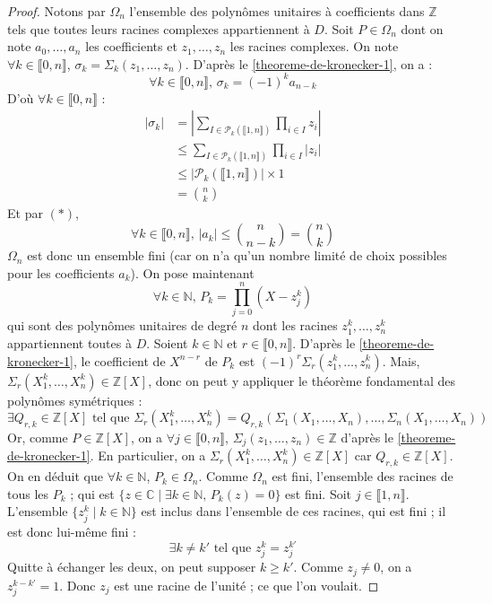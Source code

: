 	\begin{proof}
		Notons par $\Omega_n$ l'ensemble des polynômes unitaires à coefficients dans $\mathbb{Z}$ tels que toutes leurs racines complexes appartiennent à $D$. Soit $P \in \Omega_n$ dont on note $a_0, \dots, a_n$ les coefficients et $z_1, \dots, z_n$ les racines complexes. On note $\forall k \in \llbracket 0, n \rrbracket$, $\sigma_k = \Sigma_k(z_1, \dots, z_n)$. D'après le \cref{theoreme-de-kronecker-1}, on a :
		\[ \forall k \in \llbracket 0, n \rrbracket, \, \sigma_k = (-1)^k a_{n-k} \tag{$*$} \]
		D'où $\forall k \in \llbracket 0, n \rrbracket$ :
		\begin{align*}
			|\sigma_k| &= \left| \sum_{I \in \mathcal{P}_k(\llbracket 1, n \rrbracket)} \prod_{i \in I} z_i \right| \\
			&\leq \sum_{I \in \mathcal{P}_k(\llbracket 1, n \rrbracket)} \prod_{i \in I} |z_i| \\
			&\leq |\mathcal{P}_k(\llbracket 1, n \rrbracket)| \times 1 \\
			&= \binom{n}{k}
		\end{align*}
		Et par $(*)$,
		\[ \forall k \in \llbracket 0, n \rrbracket, \, |a_k| \leq \binom{n}{n-k} = \binom{n}{k} \]
		$\Omega_n$ est donc un ensemble fini (car on n'a qu'un nombre limité de choix possibles pour les coefficients $a_k$).
		\newpar
		On pose maintenant
		\[ \forall k \in \mathbb{N}, \, P_k = \prod_{j=0}^n (X-z_j^k) \]
		qui sont des polynômes unitaires de degré $n$ dont les racines $z_1^k, \dots, z_n^k$ appartiennent toutes à $D$. Soient $k \in \mathbb{N}$ et $r \in \llbracket 0, n \rrbracket$. D'après le \cref{theoreme-de-kronecker-1}, le coefficient de $X^{n-r}$ de $P_k$ est $(-1)^r \Sigma_r(z_1^k, \dots, z_n^k)$. Mais, $\Sigma_r(X_1^k, \dots, X_n^k) \in \mathbb{Z}[X]$, donc on peut y appliquer le théorème fondamental des polynômes symétriques :
		\[ \exists Q_{r,k} \in \mathbb{Z}[X] \text{ tel que } \Sigma_r(X_1^k, \dots, X_n^k) = Q_{r,k}(\Sigma_1(X_1, \dots, X_n), \dots, \Sigma_n(X_1, \dots, X_n)) \]
		Or, comme $P \in \mathbb{Z}[X]$, on a $\forall j \in \llbracket 0, n \rrbracket$, $\Sigma_j(z_1, \dots, z_n) \in \mathbb{Z}$ d'après le \cref{theoreme-de-kronecker-1}. En particulier, on a $\Sigma_r(X_1^k, \dots, X_n^k) \in \mathbb{Z}[X]$ car $Q_{r,k} \in \mathbb{Z}[X]$. On en déduit que $\forall k \in \mathbb{N}$, $P_k \in \Omega_n$.
		\newpar
		Comme $\Omega_n$ est fini, l'ensemble des racines de tous les $P_k$ ; qui est $\{ z \in \mathbb{C} \mid \exists k \in \mathbb{N}, \, P_k(z) = 0 \}$ est fini. Soit $j \in \llbracket 1, n \rrbracket$. L'ensemble $\{ z_j^k \mid k \in \mathbb{N} \}$ est inclus dans l'ensemble de ces racines, qui est fini ; il est donc lui-même fini :
		\[ \exists k \neq k' \text{ tel que } z_j^k = z_j^{k'} \]
		Quitte à échanger les deux, on peut supposer $k \geq k'$. Comme $z_j \neq 0$, on a $z_j^{k-k'} = 1$. Donc $z_j$ est une racine de l'unité ; ce que l'on voulait.
	\end{proof}

